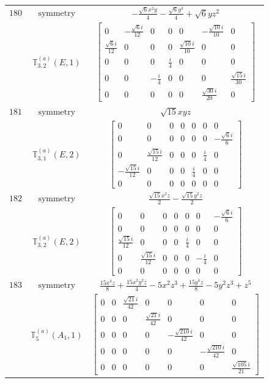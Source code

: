 \documentclass[fleqn,8pt,landscape]{jsarticle}
\begin{document}
\begin{longtable}{ccc}
$ 180 $ & $ \text{symmetry} $ & $ - \frac{\sqrt{6} x^{2} y}{4} - \frac{\sqrt{6} y^{3}}{4} + \sqrt{6} y z^{2} $ \\
$  $ & $ \mathbb{T}_{3,2}^{(a)}(E,1) $ & $ \begin{bmatrix} 0 & - \frac{\sqrt{6} i}{12} & 0 & 0 & 0 & - \frac{\sqrt{10} i}{10} & 0 \\ \frac{\sqrt{6} i}{12} & 0 & 0 & 0 & \frac{\sqrt{10} i}{10} & 0 & 0 \\ 0 & 0 & 0 & \frac{i}{4} & 0 & 0 & 0 \\ 0 & 0 & - \frac{i}{4} & 0 & 0 & 0 & \frac{\sqrt{15} i}{30} \\ 0 & 0 & 0 & 0 & 0 & \frac{\sqrt{30} i}{20} & 0 \end{bmatrix} $ \\ \hline
$ 181 $ & $ \text{symmetry} $ & $ \sqrt{15} x y z $ \\
$  $ & $ \mathbb{T}_{3,1}^{(a)}(E,2) $ & $ \begin{bmatrix} 0 & 0 & 0 & 0 & 0 & 0 & 0 \\ 0 & 0 & 0 & 0 & 0 & 0 & - \frac{\sqrt{6} i}{6} \\ 0 & \frac{\sqrt{15} i}{12} & 0 & 0 & 0 & \frac{i}{4} & 0 \\ - \frac{\sqrt{15} i}{12} & 0 & 0 & 0 & \frac{i}{4} & 0 & 0 \\ 0 & 0 & 0 & 0 & 0 & 0 & 0 \end{bmatrix} $ \\ \hline
$ 182 $ & $ \text{symmetry} $ & $ \frac{\sqrt{15} x^{2} z}{2} - \frac{\sqrt{15} y^{2} z}{2} $ \\
$  $ & $ \mathbb{T}_{3,2}^{(a)}(E,2) $ & $ \begin{bmatrix} 0 & 0 & 0 & 0 & 0 & 0 & - \frac{\sqrt{6} i}{6} \\ 0 & 0 & 0 & 0 & 0 & 0 & 0 \\ \frac{\sqrt{15} i}{12} & 0 & 0 & 0 & \frac{i}{4} & 0 & 0 \\ 0 & \frac{\sqrt{15} i}{12} & 0 & 0 & 0 & - \frac{i}{4} & 0 \\ 0 & 0 & 0 & 0 & 0 & 0 & 0 \end{bmatrix} $ \\ \hline
$ 183 $ & $ \text{symmetry} $ & $ \frac{15 x^{4} z}{8} + \frac{15 x^{2} y^{2} z}{4} - 5 x^{2} z^{3} + \frac{15 y^{4} z}{8} - 5 y^{2} z^{3} + z^{5} $ \\
$  $ & $ \mathbb{T}_{5}^{(a)}(A_{1},1) $ & $ \begin{bmatrix} 0 & 0 & \frac{\sqrt{21} i}{42} & 0 & 0 & 0 & 0 \\ 0 & 0 & 0 & \frac{\sqrt{21} i}{42} & 0 & 0 & 0 \\ 0 & 0 & 0 & 0 & - \frac{\sqrt{210} i}{42} & 0 & 0 \\ 0 & 0 & 0 & 0 & 0 & - \frac{\sqrt{210} i}{42} & 0 \\ 0 & 0 & 0 & 0 & 0 & 0 & \frac{\sqrt{105} i}{21} \end{bmatrix} $ \\ \hline

\end{longtable}
\end{document}
